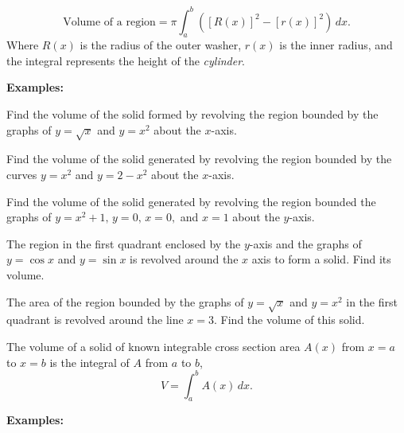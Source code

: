 \begin{tcolorbox}[title= VOLUME OF A REGION USING WASHERS,colframe=black,sharp corners,colback=white,colbacktitle=white,coltitle=black,boxrule=1pt]

     \[\text{Volume of a region}=\pi\int_a^b\left(\left[R(x)\right]^2-\left[r(x)\right]^2\right)\,dx.\]
     Where $R(x)$ is the radius of the outer washer, $r(x)$ is the inner radius, and the integral represents the height of the \textit{cylinder}.
    
\end{tcolorbox}

\textbf{Examples:}
\begin{questions}
    \question Find the volume of the solid formed by revolving the region bounded by the graphs of $y=\sqrt{x}$ and $y=x^2$ about the $x$-axis.
    
    \question Find the volume of the solid generated by revolving the region bounded by the curves $y=x^2$ and $y=2-x^2$ about the $x$-axis.
    
    \newpage
    
    \question Find the volume of the solid generated by revolving the region bounded the graphs of $y=x^2+1,\,y=0,\,x=0,$ and $x=1$ about the $y$-axis.
    
    \question The region in the first quadrant enclosed by the $y$-axis and the graphs of $y=\cos x$ and $y=\sin x$ is revolved around the $x$ axis to form a solid. Find its volume.
    
    \question The area of the region bounded by the graphs of $y=\sqrt{x}$ and $y=x^2$ in the first quadrant is revolved around the line $x=3$. Find the volume of this solid.
    
\end{questions}

\newpage

\begin{tcolorbox}[title= VOLUME OF KNOWN CROSS SECTION,colframe=black,sharp corners,colback=white,colbacktitle=white,coltitle=black,boxrule=1pt]

    The volume of a solid of known integrable cross section area $A(x)$ from $x=a$ to $x=b$ is the integral of $A$ from $a$ to $b$,
    \[V=\int_a^b A(x)\,dx.\]
    
\end{tcolorbox}
\textbf{Examples:}

